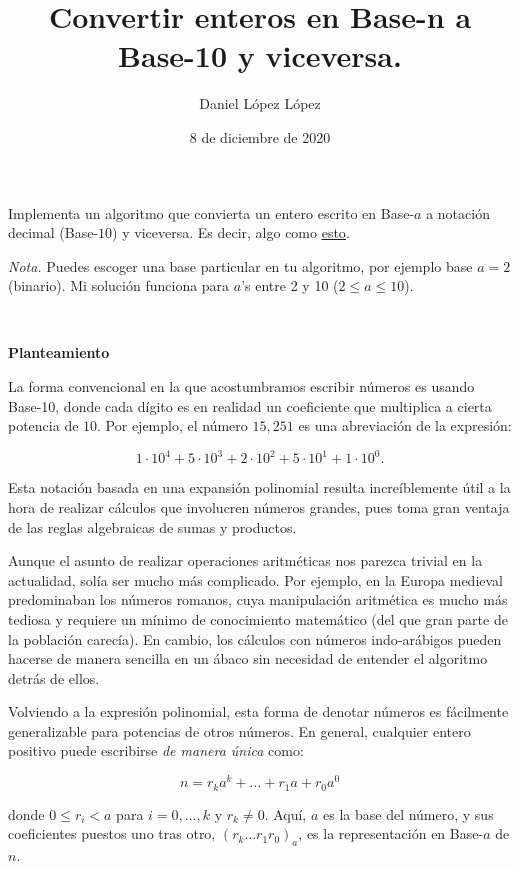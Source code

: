 \documentclass[10pt, letterpaper]{article}
\title{\textbf{Convertir enteros en Base-n a Base-10 y viceversa.}}
\author{Daniel López López}
\date{8 de diciembre de 2020}
\begin{document}
\maketitle

Implementa un algoritmo que convierta un entero escrito en Base-$a$ a notación decimal (Base-$10$) y viceversa. Es decir, algo como \href{https://www.rapidtables.com/convert/number/base-converter.html}{\underline{esto}}.

\emph{Nota.} Puedes escoger una base particular en tu algoritmo, por ejemplo base $a=2$ (binario). Mi solución funciona para $a$'s entre 2 y 10 ($2\leq a \leq 10$). 

\

\textbf{Planteamiento}

La forma convencional en la que acostumbramos escribir números es usando Base-10, donde cada dígito es en realidad un coeficiente que multiplica a cierta potencia de $10$. Por ejemplo, el número $15,251$ es una abreviación de la expresión:

\[ 1\cdot 10^4 + 5\cdot 10^3 + 2\cdot 10^2 + 5\cdot 10^1 + 1\cdot 10^0.\]

Esta notación basada en una expansión polinomial resulta increíblemente útil a la hora de realizar cálculos que involucren números grandes, pues toma gran ventaja de las reglas algebraicas de sumas y productos. 

Aunque el asunto de realizar operaciones aritméticas nos parezca trivial en la actualidad, solía ser mucho más complicado. Por ejemplo, en la Europa medieval predominaban los números romanos, cuya manipulación aritmética es mucho más tediosa  y requiere un mínimo de conocimiento matemático (del que gran parte de la población carecía).  En cambio, los cálculos con números indo-arábigos pueden hacerse de manera sencilla en un ábaco sin necesidad de entender el algoritmo detrás de ellos.

\vspace{3em}

Volviendo a la expresión polinomial, esta forma de denotar números es fácilmente generalizable para potencias de otros números. En general, cualquier entero positivo puede escribirse \emph{de manera única} como:

\[ n=r_ka^k + \ldots + r_1a+r_0a^0 \]

donde $0\leq r_i<a$ para $i=0,\ldots , k$ y $r_k\neq 0$. Aquí, $a$ es la base del número, y sus coeficientes puestos uno tras otro, $(r_k\ldots r_1r_0)_a$, es la representación en Base-$a$ de $n$.
\end{document}
